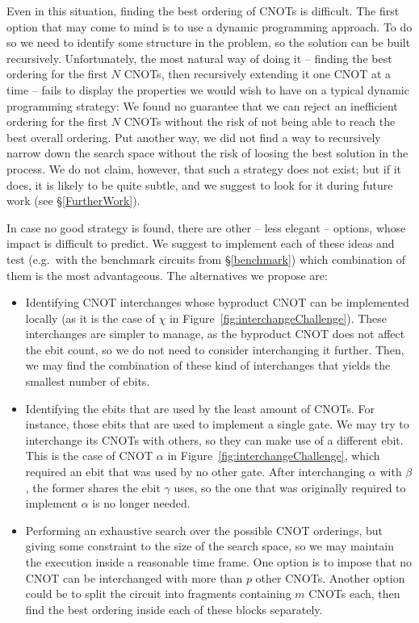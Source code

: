 Even in this situation, finding the best ordering of CNOTs is difficult. The first option that may come to mind is to use a dynamic programming approach. To do so we need to identify some structure in the problem, so the solution can be built recursively. Unfortunately, the most natural way of doing it -- finding the best ordering for the first \(N\) CNOTs, then recursively extending it one CNOT at a time -- fails to display the properties we would wish to have on a typical dynamic programming strategy: We found no guarantee that we can reject an inefficient ordering for the first \(N\) CNOTs without the risk of not being able to reach the best overall ordering. Put another way, we did not find a way to recursively narrow down the search space without the risk of loosing the best solution in the process. We do not claim, however, that such a strategy does not exist; but if it does, it is likely to be quite subtle, and we suggest to look for it during future work (see \S\ref{FurtherWork}).

In case no good strategy is found, there are other -- less elegant -- options, whose impact is difficult to predict. We suggest to implement each of these ideas and test (e.g.\ with the benchmark circuits from \S\ref{benchmark}) which combination of them is the most advantageous. The alternatives we propose are:

\begin{itemize}

\item Identifying CNOT interchanges whose byproduct CNOT can be implemented locally (as it is the case of \(\chi\) in Figure~\ref{fig:interchangeChallenge}). These interchanges are simpler to manage, as the byproduct CNOT does not affect the ebit count, so we do not need to consider interchanging it further. Then, we may find the combination of these kind of interchanges that yields the smallest number of ebits.

\item Identifying the ebits that are used by the least amount of CNOTs. For instance, those ebits that are used to implement a single gate. We may try to interchange its CNOTs with others, so they can make use of a different ebit. This is the case of CNOT \(\alpha\) in Figure~\ref{fig:interchangeChallenge}, which required an ebit that was used by no other gate. After interchanging \(\alpha\) with \(\beta\), the former shares the ebit \(\gamma\) uses, so the one that was originally required to implement \(\alpha\) is no longer needed.

\item Performing an exhaustive search over the possible CNOT orderings, but giving some constraint to the size of the search space, so we may maintain the execution inside a reasonable time frame. One option is to impose that no CNOT can be interchanged with more than \(p\) other CNOTs. Another option could be to split the circuit into fragments containing \(m\) CNOTs each, then find the best ordering inside each of these blocks separately.

\end{itemize}
